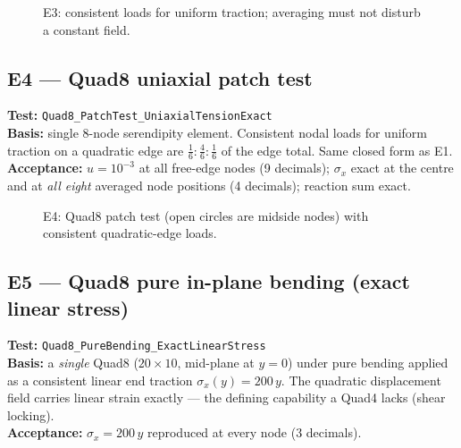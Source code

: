\documentclass[11pt,a4paper]{article}
\newcommand{\wall}[3]{%
  \draw[thick] (#1,#2) -- (#1,#3);
  \fill[pattern=north east lines] (#1-0.18,#2) rectangle (#1,#3);
}
\begin{document}
\begin{figure}[H]\centering
{}
\caption{E3: consistent loads for uniform traction; averaging must not disturb a constant field.}
\end{figure}

\subsection{E4 --- Quad8 uniaxial patch test}
\textbf{Test:} \texttt{Quad8\_PatchTest\_UniaxialTensionExact}\\
\textbf{Basis:} single 8-node serendipity element. Consistent nodal loads for
uniform traction on a quadratic edge are $\tfrac16 : \tfrac46 : \tfrac16$ of
the edge total. Same closed form as E1.\\
\textbf{Acceptance:} $u=10^{-3}$ at all free-edge nodes (9 decimals);
$\sigma_x$ exact at the centre and at \emph{all eight} averaged node positions
(4 decimals); reaction sum exact.

\begin{figure}[H]\centering
{}
\caption{E4: Quad8 patch test (open circles are midside nodes) with consistent quadratic-edge loads.}
\end{figure}

\subsection{E5 --- Quad8 pure in-plane bending (exact linear stress)}
\textbf{Test:} \texttt{Quad8\_PureBending\_ExactLinearStress}\\
\textbf{Basis:} a \emph{single} Quad8 ($20\times10$, mid-plane at $y=0$) under
pure bending applied as a consistent linear end traction
$\sigma_x(y) = 200\,y$. The quadratic displacement field carries linear strain
exactly --- the defining capability a Quad4 lacks (shear locking).\\
\textbf{Acceptance:} $\sigma_x = 200\,y$ reproduced at every node (3 decimals).
\end{document}
